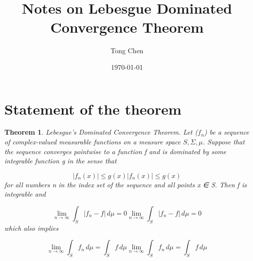 \documentclass{article}
\title{Notes on Lebesgue Dominated Convergence Theorem}
\author{Tong Chen}
\date{\today}
\newtheorem{theorem}{Theorem}
\begin{document}
    \maketitle
\section{Statement of the theorem}
\begin{theorem}\label{thm:DCT}
Lebesgue's Dominated Convergence Theorem. Let ($f_n$) be a sequence of complex-valued measurable functions on a measure space $S, \Sigma, \mu$. Suppose that the sequence converges pointwise to a function f and is dominated by some integrable function g in the sense that

$${\displaystyle |f_{n}(x)|\leq g(x)}    |f_n(x)| \le g(x)$$
for all numbers n in the index set of the sequence and all points x ∈ S. Then f is integrable and

$${\displaystyle \lim _{n\to \infty }\int _{S}|f_{n}-f|\,d\mu =0} \lim_{n\to\infty} \int_S |f_n-f|\,d\mu = 0$$
which also implies

$${\displaystyle \lim _{n\to \infty }\int _{S}f_{n}\,d\mu =\int _{S}f\,d\mu }\lim_{n\to\infty} \int_S f_n\,d\mu = \int_S f\,d\mu$$
\end{theorem}
\end{document}
